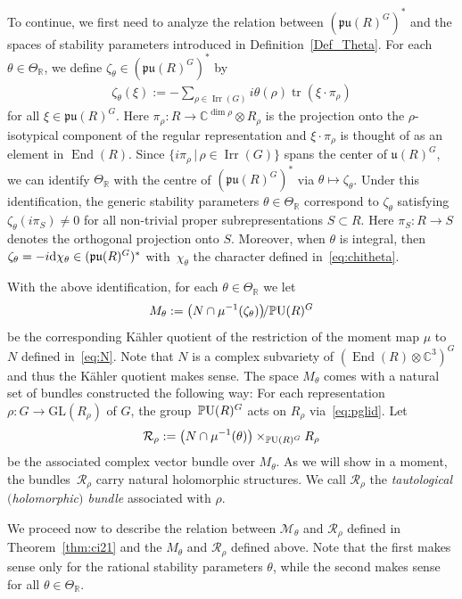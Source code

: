 \documentclass[10pt,a4paper]{amsart}
\numberwithin{equation}{section}
\newcommand{\rd}{{\rm d}}
\newcommand{\cR}{\mathcal{R}}
\newcommand{\sM}{\mathscr{M}}
\newcommand{\sR}{\mathscr{R}}
\newcommand{\fu}{{\mathfrak u}}
\newcommand{\R}{{\mathbb R}}
\newcommand{\C}{{\mathbb C}}
\newcommand{\fpu}{\mathfrak{pu}}
\newcommand{\GL}{\mathrm{GL}}
\newcommand{\PU}{{\mathbb P}{\rm U}}
\newcommand{\Irr}{\operatorname{Irr}}
\newcommand{\End}{\operatorname{End}}
\newcommand{\tr}{\operatorname{tr}}
\begin{document}
To continue, we f\/irst need to analyze the relation between
$(\fpu(R)^G)^*$ and the spaces of stability parameters introduced in
Def\/inition~\ref{Def_Theta}.  For each $\theta\in\Theta_\R$, we def\/ine
$\zeta_\theta\in(\fpu(R)^G)^*$ by
\begin{gather*}
  \zeta_\theta(\xi)
    := -\sum_{\rho\in\Irr(G)} i\theta(\rho)\tr(\xi\cdot \pi_\rho)
\end{gather*}
for all $\xi \in \fpu(R)^G$. Here $\pi_{\rho}\colon R \to \C^{\dim \rho}
\otimes R_{\rho} $ is the projection onto the $\rho$-isotypical
component of the regular representation and $\xi \cdot \pi_{\rho}$
is thought of as an element in $\End(R)$. Since $\{i\pi_\rho\,|\, \rho
\in \Irr(G)\}$ spans the center of $\fu(R)^G$, we can identify
$\Theta_{\R}$ with the centre of $(\fpu(R)^G)^*$ via
$\theta\mapsto\zeta_\theta$. Under this identif\/ication, the generic
stability parameters $\theta \in \Theta_\R$ correspond to
$\zeta_{\theta}$ satisfying $\zeta_{\theta}(i\pi_S) \neq 0$ for all
non-trivial proper subrepresentations $S \subset R$. Here $\pi_S\colon R
\to S$ denotes the orthogonal projection onto $S$.  Moreover, when
$\theta$ is integral, then $\zeta_\theta=-i\rd \chi_{\theta} \in
(\fpu(R)^G)^*$ with~$\chi_{\theta}$ the character def\/ined in~\eqref{eq:chitheta}.

With the above identif\/ication, for each $\theta \in \Theta_\R$ we let
\begin{gather}\label{eq:Mtheta-K}
  M_\theta: = \big(N\cap \mu^{-1}(\zeta_{\theta})\big)\!/ \PU(R)^G
\end{gather}
be the corresponding K\"ahler quotient of the restriction of the moment
map $\mu$ to $N$ def\/ined in~\eqref{eq:N}. Note that $N$ is a complex
subvariety of $(\End(R) \otimes \C^3)^G$ and thus the K\"ahler quotient
makes sense.  The space $M_{\theta}$ comes with a natural set of
bundles constructed the following way: For each representation
$\rho\colon G \to \GL(R_{\rho})$ of $G$, the group~$\PU(R)^G$ acts on
$R_{\rho}$ via~\eqref{eq:pglid}.  Let
\begin{gather*}%
  \cR_\rho:=\big(N\cap \mu^{-1}(\theta)\big)\times_{\PU(R)^G} R_{\rho}
\end{gather*}
be the associated complex vector bundle over $M_\theta$.  As we will
show in a moment, the bund\-les~$\cR_\rho$ carry natural holomorphic
structures.  We call $\cR_{\rho}$ the \emph{tautological $($holomorphic$)$
  bundle} associated with $\rho$.

We proceed now to describe the relation between $\sM_{\theta}$ and
$\sR_{\rho}$ def\/ined in Theorem~\ref{thm:ci21} and the $M_{\theta}$
and $\cR_{\rho}$ def\/ined above. Note that the f\/irst makes sense only
for the rational stability parameters $\theta$, while the second makes sense
for all $\theta\in\Theta_\R$.
\end{document}
